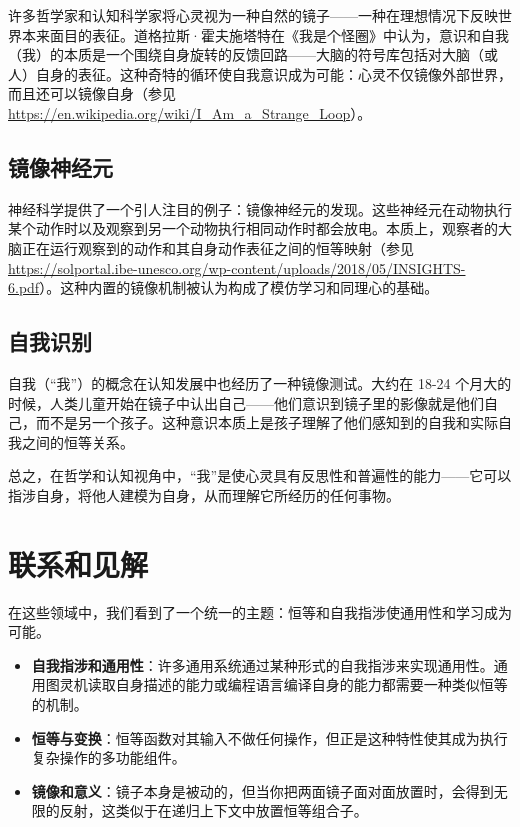 \documentclass[12pt]{article}
\begin{document}
许多哲学家和认知科学家将心灵视为一种自然的镜子——一种在理想情况下反映世界本来面目的表征。道格拉斯·霍夫施塔特在《我是个怪圈》中认为，意识和自我（我）的本质是一个围绕自身旋转的反馈回路——大脑的符号库包括对大脑（或人）自身的表征。这种奇特的循环使自我意识成为可能：心灵不仅镜像外部世界，而且还可以镜像自身（参见 \url{https://en.wikipedia.org/wiki/I_Am_a_Strange_Loop}）。

\subsection{镜像神经元}

神经科学提供了一个引人注目的例子：镜像神经元的发现。这些神经元在动物执行某个动作时以及观察到另一个动物执行相同动作时都会放电。本质上，观察者的大脑正在运行观察到的动作和其自身动作表征之间的恒等映射（参见 \url{https://solportal.ibe-unesco.org/wp-content/uploads/2018/05/INSIGHTS-6.pdf}）。这种内置的镜像机制被认为构成了模仿学习和同理心的基础。

\subsection{自我识别}

自我（“我”）的概念在认知发展中也经历了一种镜像测试。大约在 18-24 个月大的时候，人类儿童开始在镜子中认出自己——他们意识到镜子里的影像就是他们自己，而不是另一个孩子。这种意识本质上是孩子理解了他们感知到的自我和实际自我之间的恒等关系。

总之，在哲学和认知视角中，“我”是使心灵具有反思性和普遍性的能力——它可以指涉自身，将他人建模为自身，从而理解它所经历的任何事物。

\section{联系和见解}

在这些领域中，我们看到了一个统一的主题：恒等和自我指涉使通用性和学习成为可能。

\begin{itemize}
    \item \textbf{自我指涉和通用性}：许多通用系统通过某种形式的自我指涉来实现通用性。通用图灵机读取自身描述的能力或编程语言编译自身的能力都需要一种类似恒等的机制。
    \item \textbf{恒等与变换}：恒等函数对其输入不做任何操作，但正是这种特性使其成为执行复杂操作的多功能组件。
    \item \textbf{镜像和意义}：镜子本身是被动的，但当你把两面镜子面对面放置时，会得到无限的反射，这类似于在递归上下文中放置恒等组合子。
\end{itemize}
\end{document}
